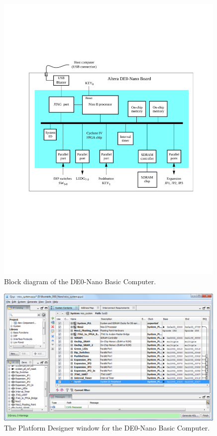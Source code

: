 \documentclass[11pt, twoside, pdftex]{article}
\begin{document}
\begin{figure}[H]
   \begin{center}
        \includegraphics[width=0.99\textwidth]{figures/fig_block_diagram.pdf}
   \end{center}
   \caption{Block diagram of the DE0-Nano Basic Computer.}
	\label{fig:block_diagram}
\end{figure}

\newpage
\begin{figure}[H]
   \begin{center}
        \includegraphics[width=0.99\textwidth]{figures/qsys.png}
   \end{center}
   \caption{The Platform Designer window for the DE0-Nano Basic Computer.}
	\label{fig:qsys}
\end{figure}
\end{document}
